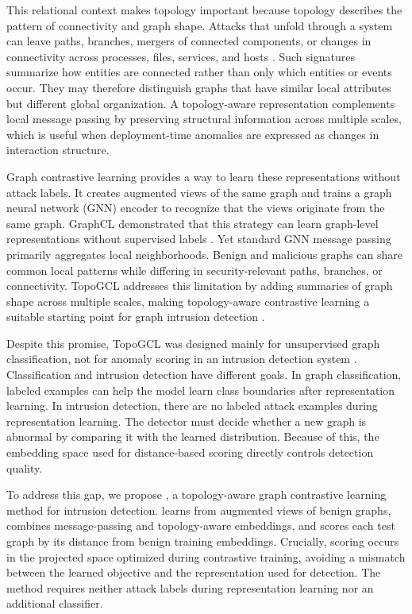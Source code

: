 This relational context makes topology important because topology describes the pattern of connectivity and graph shape. Attacks that unfold through a system can leave paths, branches, mergers of connected components, or changes in connectivity across processes, files, services, and hosts \cite{fang2022lmtracker,zhou2024lmdetect}. Such signatures summarize how entities are connected rather than only which entities or events occur. They may therefore distinguish graphs that have similar local attributes but different global organization. A topology-aware representation complements local message passing by preserving structural information across multiple scales, which is useful when deployment-time anomalies are expressed as changes in interaction structure.

Graph contrastive learning provides a way to learn these representations without attack labels. It creates augmented views of the same graph and trains a graph neural network (GNN) encoder to recognize that the views originate from the same graph. GraphCL demonstrated that this strategy can learn graph-level representations without supervised labels \cite{you2020graphcl}. Yet standard GNN message passing primarily aggregates local neighborhoods. Benign and malicious graphs can share common local patterns while differing in security-relevant paths, branches, or connectivity. TopoGCL addresses this limitation by adding summaries of graph shape across multiple scales, making topology-aware contrastive learning a suitable starting point for graph intrusion detection \cite{chen2024topogcl}.

Despite this promise, TopoGCL was designed mainly for unsupervised graph classification, not for anomaly scoring in an intrusion detection system \cite{chen2024topogcl}. Classification and intrusion detection have different goals. In graph classification, labeled examples can help the model learn class boundaries after representation learning. In intrusion detection, there are no labeled attack examples during representation learning. The detector must decide whether a new graph is abnormal by comparing it with the learned distribution. Because of this, the embedding space used for distance-based scoring directly controls detection quality.

To address this gap, we propose \sysname, a topology-aware graph contrastive learning method for intrusion detection. \sysname learns from augmented views of benign graphs, combines message-passing and topology-aware embeddings, and scores each test graph by its distance from benign training embeddings. Crucially, scoring occurs in the projected space optimized during contrastive training, avoiding a mismatch between the learned objective and the representation used for detection. The method requires neither attack labels during representation learning nor an additional classifier.


